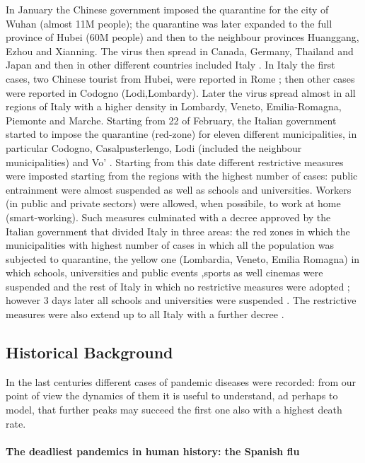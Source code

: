 \documentclass[
12pt, %
a4paper, %
oneside, %
headinclude,footinclude, %
BCOR5mm, %
]{scrartcl}
\begin{document}
In January the Chinese government imposed the quarantine for the city of Wuhan (almost 11M people); the quarantine was later expanded to the full province of Hubei (60M people) and then to the neighbour provinces Huanggang, Ezhou and Xianning. 
The virus then spread in Canada, Germany, Thailand and Japan and then in other different countries included Italy \cite{timeline+web}. In Italy the first cases, two Chinese tourist from Hubei, were reported in Rome \cite{corr+roma}; then  other cases were reported in Codogno (Lodi,Lombardy). Later the virus spread almost in all regions of Italy with a higher density in Lombardy, Veneto, Emilia-Romagna, Piemonte and Marche. Starting from 22 of February, the Italian government started to impose the quarantine (red-zone) for eleven different municipalities, in particular Codogno, Casalpusterlengo, Lodi (included the neighbour municipalities) and Vo' . Starting from this date different restrictive measures were imposted starting from the regions with the highest number of cases: public entrainment were almost suspended as well as schools and universities. Workers (in public and private sectors) were allowed, when possibile, to work at home (smart-working). Such measures culminated with a decree approved by the Italian government that divided Italy in three areas: the red zones in which the municipalities with highest number of cases in which all the population was subjected to quarantine, the yellow one (Lombardia, Veneto, Emilia Romagna) in which schools, universities and public events ,sports  as well cinemas were suspended and the rest of Italy in which no restrictive measures were adopted \cite{rep+dec1}; however 3 days later all schools and universities were suspended \cite{guard+01}. The restrictive measures were also extend up to all Italy with a further decree \cite{11marzo}. 

\subsection{Historical Background}



In the last centuries different cases of pandemic diseases were recorded: from our point of view the dynamics of them it is useful to understand, ad perhaps to model,  that further peaks may succeed the first one also with a highest death rate. 

\paragraph{The  deadliest pandemics in human history: the Spanish flu}
\end{document}
